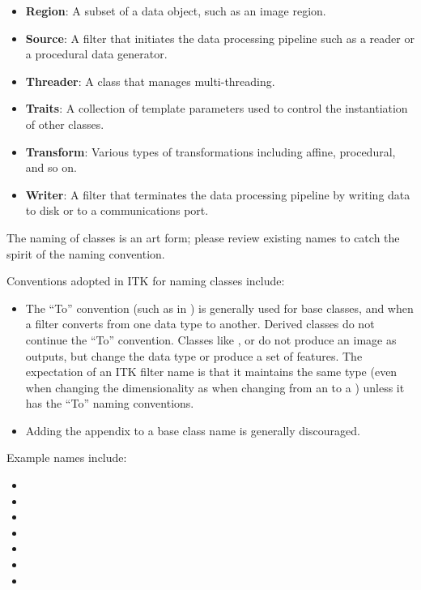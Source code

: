 \begin{itemize}
\item \textbf{Region}: A subset of a data object, such as an image region.
\item \textbf{Source}: A filter that initiates the data processing pipeline such
as a reader or a procedural data generator.
\item \textbf{Threader}: A class that manages multi-threading.
\item \textbf{Traits}: A collection of template parameters used to control the
instantiation of other classes.
\item \textbf{Transform}: Various types of transformations including affine,
procedural, and so on.
\item \textbf{Writer}: A filter that terminates the data processing pipeline by
writing data to disk or to a communications port.
\end{itemize}

The naming of classes is an art form; please review existing names to catch the
spirit of the naming convention.

Conventions adopted in ITK for naming classes include:
\begin{itemize}
\item The ``To'' convention (such as in ) is
generally used for base classes, and when a filter converts from one data type
to another. Derived classes do not continue the ``To'' convention. Classes like
, or
 do not produce an image as outputs, but change
the data type or produce a set of features. The expectation of an ITK filter
name is that it maintains the same type (even when changing the dimensionality
as when changing from an  to a ) unless
it has the ``To'' naming conventions.
\item Adding the  appendix to a base class name is generally
discouraged.
\end{itemize}

Example names include:
\begin{itemize}
\item {}
\item {}
\item {}
\item {}
\item {}
\item {}
\item {}
\end{itemize}


